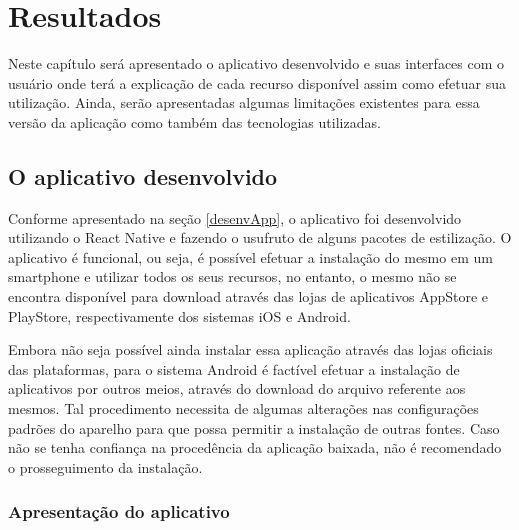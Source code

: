 \chapter{Resultados}

 Neste capítulo será apresentado o aplicativo desenvolvido e suas interfaces com o usuário onde terá a explicação de cada recurso disponível assim como efetuar sua utilização. Ainda, serão apresentadas algumas limitações existentes para essa versão da aplicação como também das tecnologias utilizadas.
 
\section{O aplicativo desenvolvido}
\label{sec-app-desenvolvido}

Conforme apresentado na seção \ref{desenvApp}, o aplicativo foi desenvolvido utilizando o React Native e fazendo o usufruto de alguns pacotes de estilização. O aplicativo é funcional, ou seja, é possível efetuar a instalação do mesmo em um smartphone e utilizar todos os seus recursos, no entanto, o mesmo não se encontra disponível para download através das lojas de aplicativos AppStore e PlayStore, respectivamente dos sistemas iOS e Android.

Embora não seja possível ainda instalar essa aplicação através das lojas oficiais das plataformas, para o sistema Android é factível efetuar a instalação de aplicativos por outros meios, através do download do arquivo referente aos mesmos. Tal procedimento necessita de algumas alterações nas configurações padrões do aparelho para que possa permitir a instalação de outras fontes. Caso não se tenha confiança na procedência da aplicação baixada, não é recomendado o prosseguimento da instalação.

\newpage
\subsection{Apresentação do aplicativo}

